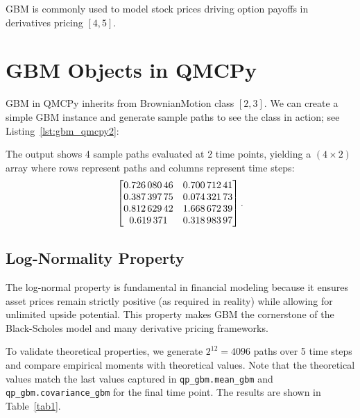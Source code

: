 \documentclass{article}
\begin{document}
GBM is commonly used to model stock prices driving option payoffs in derivatives pricing $[4, 5]$. 

\section{GBM Objects in QMCPy}

GBM in QMCPy inherits from BrownianMotion class $[2, 3]$. 
We can create a simple GBM instance and generate sample paths to see the class in action; see Listing~\ref{lst:gbm_qmcpy2}:



The output shows 4 sample paths evaluated at 2 time points, yielding a $(4 \times 2)$ array where rows represent paths and columns represent time steps:
\[
\left[
\begin{array}{@{} S[table-format=1.8] S[table-format=1.8] @{}}
\num{0.72608046} & \num{0.70071241} \\
\num{0.38739775} & \num{0.07432173} \\
\num{0.81262942} & \num{1.66867239} \\
\num{0.619371} & \num{0.31898397}
\end{array}
\right].
\]

\subsection{Log-Normality Property}

The log-normal property is fundamental in financial modeling because it ensures asset prices remain strictly positive (as required in reality) while allowing for unlimited upside potential. This property makes GBM the cornerstone of the Black-Scholes model and many derivative pricing frameworks.

To validate theoretical properties, we generate $2^{12} = 4096$ paths over 5 time steps and compare empirical moments with theoretical values.  Note that the theoretical values match the last values captured in \texttt{qp\_gbm.mean\_gbm} and \texttt{qp\_gbm.covariance\_gbm} for the final time point. The results are shown in Table~\ref{tab1}.

 
\end{document}
